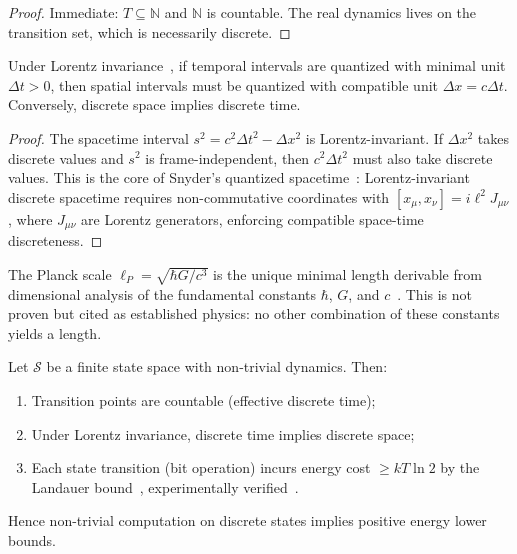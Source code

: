 \begin{proof}
Immediate: $T \subseteq \mathbb{N}$ and $\mathbb{N}$ is countable. The real dynamics lives on the transition set, which is necessarily discrete.
\end{proof}

\begin{proposition}\label{prop:lorentz-discrete}
Under Lorentz invariance~\cite{einstein1905electrodynamics,minkowski1908space}, if temporal intervals are quantized with minimal unit $\Delta t > 0$, then spatial intervals must be quantized with compatible unit $\Delta x = c\Delta t$. Conversely, discrete space implies discrete time.
\end{proposition}

\begin{proof}
The spacetime interval $s^2 = c^2\Delta t^2 - \Delta x^2$ is Lorentz-invariant. If $\Delta x^2$ takes discrete values and $s^2$ is frame-independent, then $c^2\Delta t^2$ must also take discrete values. This is the core of Snyder's quantized spacetime~\cite{snyder1947quantized}: Lorentz-invariant discrete spacetime requires non-commutative coordinates with $[x_\mu, x_\nu] = i\ell^2 J_{\mu\nu}$, where $J_{\mu\nu}$ are Lorentz generators, enforcing compatible space-time discreteness.
\end{proof}

The Planck scale $\ell_P = \sqrt{\hbar G / c^3}$ is the unique minimal length derivable from dimensional analysis of the fundamental constants $\hbar$, $G$, and $c$~\cite{planck1899irreversible}. This is not proven but cited as established physics: no other combination of these constants yields a length.

\begin{proposition}\label{prop:comp-thermo-chain}
Let $\mathcal{S}$ be a finite state space with non-trivial dynamics. Then:
\begin{enumerate}
  \item Transition points are countable (effective discrete time);
  \item Under Lorentz invariance, discrete time implies discrete space;
  \item Each state transition (bit operation) incurs energy cost $\ge kT\ln 2$ by the Landauer bound~\cite{landauer1961irreversibility,bennett2003notes}, experimentally verified~\cite{berut2012experimental}.
\end{enumerate}
Hence non-trivial computation on discrete states implies positive energy lower bounds.
\end{proposition}


